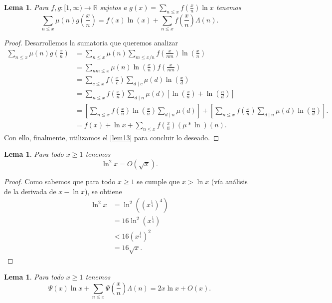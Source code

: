 \documentclass[10pt]{article}
\newtheorem{lemma}[theorem]{Lema}
\theoremstyle{definition}
\theoremstyle{remark}
\newcommand{\BR}{\mathbb R}
\begin{document}
\begin{lemma}\label{lem15}
Para $f, g : [1, \infty) \to \BR$ sujetos a  $g(x) = \sum_{n \leq x} f\left(\frac{x}{n}\right) \ln x$ tenemos
\[
\sum_{n \leq x} \mu(n) g\left(\frac{x}{n}\right) = f(x) \ln(x) + \sum_{n \leq x} f\left(\frac{x}{n}\right) \Lambda(n).
\]
\end{lemma}
\begin{proof}
Desarrollemos la sumatoria que queremos analizar
\begin{align}
\sum_{n \leq x} \mu(n) g\left(\frac{x}{n}\right) &= \sum_{n \leq x} \mu(n) \sum_{m \leq x/n} f\left(\frac{x}{nm}\right) \ln \left(\frac{x}{n}\right) \\
&= \sum_{nm \leq x} \mu(n) \ln\left(\frac{x}{n}\right) f \left(\frac{x}{nm}\right) \\    
&= \sum_{c \leq x} f\left(\frac{x}{c}\right) \sum_{d \mid c} \mu(d) \ln\left(\frac{x}{d}\right) \\
&= \sum_{n \leq x} f\left(\frac{x}{n}\right) \sum_{d \mid n} \mu(d) \left[\ln \left(\frac{x}{n}\right) + \ln\left(\frac{n}{d}\right)\right] \\
&= \left[\sum_{n \leq x} f\left(\frac{x}{n}\right) \ln\left(\frac{x}{n}\right) \sum_{d \mid n} \mu(d)\right]
+  \left[\sum_{n \leq x} f\left(\frac{x}{n}\right) \sum_{d \mid n} \mu(d) \ln\left(\frac{n}{d}\right)\right].\\
&= f(x) +  \ln{x} +  \sum_{n \leq x} f\left(\frac{x}{n}\right) (\mu * \ln)(n). 
\end{align}
Con ello, finalmente, 
utilizamos el \cref{lem13} para concluir lo deseado. 
\end{proof}

\begin{lemma}\label{lem16}
Para todo $x \geq 1$ tenemos
\[
\ln^2 x = O(\sqrt{x}).
\]
\end{lemma}

\begin{proof}
Como sabemos que para todo $x \geq 1$ se cumple que $x > \ln x$ (v\'ia an\'alisis de la  derivada de $x - \ln x$), 
se obtiene
\begin{align}
\ln^2 x &= \ln^2 ((x ^ {\frac{1}{4}}) ^ 4) \\
&= 16 \ln^2 (x ^ {\frac{1}{4}}) \\
&< 16 (x ^ {\frac{1}{4}}) ^ 2 \\
&= 16 \sqrt{x}.
\end{align}
\end{proof}

\begin{lemma}\label{lem17}
Para todo $x \geq 1$ tenemos
$$\Psi(x) \ln x + \sum_{n \leq x} \Psi\left(\frac{x}{n}\right)\Lambda(n) = 2x\ln x + O(x).$$
\end{lemma}
\end{document}
